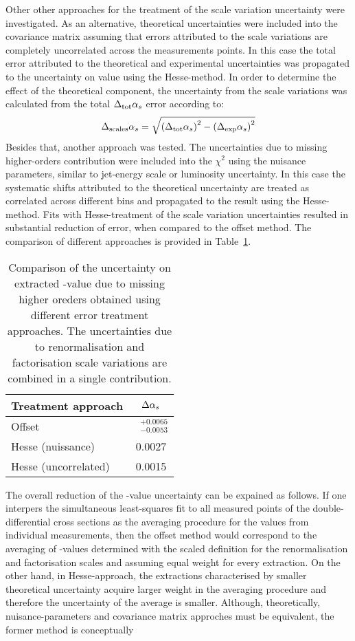Other other approaches for the treatment of the scale variation uncertainty were investigated. As an alternative, theoretical uncertainties were included into the covariance matrix assuming that errors attributed to the scale variations are completely uncorrelated across the measurements points. In this case the total error attributed to the theoretical and experimental uncertainties was propagated to the uncertainty on \asz value using the Hesse-method. In order to determine the effect of the theoretical component, the uncertainty from the scale variations was calculated from the total $\Delta_\text{tot}\mbox{$\alpha_{s}$}$ error according to:
\begin{equation}
 \Delta_\text{scales}\mbox{$\alpha_{s}$} = \sqrt{\left(\Delta_\text{tot}\mbox{$\alpha_{s}$}\right)^2 - \left(\Delta_\text{exp}\mbox{$\alpha_{s}$}\right)^2}
\end{equation}
Besides that, another approach was tested. The uncertainties due to missing higher-orders contribution were included into the $\chi^2$ using the nuisance parameters, similar to jet-energy scale or luminosity uncertainty. In this case the systematic shifts attributed to the theoretical uncertainty are treated as correlated across different bins and propagated to the result using the Hesse-method. Fits with Hesse-treatment of the scale variation uncertainties resulted in substantial reduction of \asz error, when compared to the offset method. The comparison of different approaches is provided in Table~\ref{tab:scaleuncvariants}.
\begin{table}[h]
\centering
\begin{tabular}{|l|c|}
 \hline
 Treatment approach & $\Delta\mbox{$\alpha_{s}$}$ \\
 \hline
 \hline
  Offset & $\phantom{x}^{+0.0065}_{-0.0053}$\\
  Hesse (nuissance) & 0.0027 \\
  Hesse (uncorrelated) & 0.0015 \\
 \hline
\end{tabular}
\caption{Comparison of the uncertainty on extracted \asz-value due to missing higher oreders obtained using different error treatment approaches. The uncertainties due to renormalisation and factorisation scale variations are combined in a single contribution.}
\label{tab:scaleuncvariants}
\end{table}
The overall reduction of the \asz-value uncertainty can be expained as follows. If one interpers the simultaneous least-squares fit to all measured points of the double-differential cross sections as the averaging procedure for the \asz values from individual measurements, then the offset method would correspond to the averaging of \asz-values determined with the scaled definition for the renormalisation and factorisation scales and assuming equal weight for every extraction. On the other hand, in Hesse-approach, the extractions characterised by smaller theoretical uncertainty acquire larger weight in the averaging procedure and therefore the uncertainty of the average \asz is smaller. Although, theoretically, nuisance-parameters and covariance matrix approches must be equivalent, the former method is conceptually  

